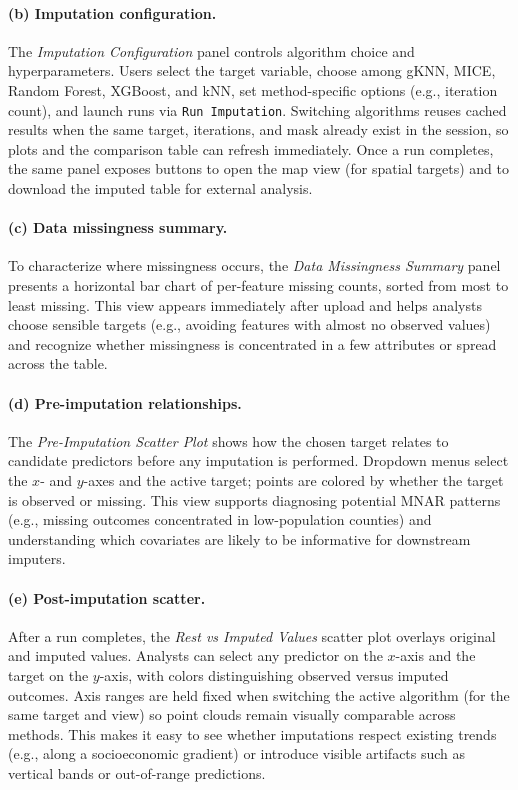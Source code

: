 \documentclass[review]{vgtc}
\begin{document}
\paragraph*{(b) Imputation configuration.}
The \emph{Imputation Configuration} panel controls algorithm choice and hyperparameters. Users select the target variable, choose among gKNN, MICE, Random Forest, XGBoost, and kNN, set method-specific options (e.g., iteration count), and launch runs via \texttt{Run Imputation}. Switching algorithms reuses cached results when the same target, iterations, and mask already exist in the session, so plots and the comparison table can refresh immediately. Once a run completes, the same panel exposes buttons to open the map view (for spatial targets) and to download the imputed table for external analysis.

\paragraph*{(c) Data missingness summary.}
To characterize where missingness occurs, the \emph{Data Missingness Summary} panel presents a horizontal bar chart of per-feature missing counts, sorted from most to least missing. This view appears immediately after upload and helps analysts choose sensible targets (e.g., avoiding features with almost no observed values) and recognize whether missingness is concentrated in a few attributes or spread across the table.

\paragraph*{(d) Pre-imputation relationships.}
The \emph{Pre-Imputation Scatter Plot} shows how the chosen target relates to candidate predictors before any imputation is performed. Dropdown menus select the $x$- and $y$-axes and the active target; points are colored by whether the target is observed or missing. This view supports diagnosing potential MNAR patterns (e.g., missing outcomes concentrated in low-population counties) and understanding which covariates are likely to be informative for downstream imputers.

\paragraph*{(e) Post-imputation scatter.}
After a run completes, the \emph{Rest vs Imputed Values} scatter plot overlays original and imputed values. Analysts can select any predictor on the $x$-axis and the target on the $y$-axis, with colors distinguishing observed versus imputed outcomes. Axis ranges are held fixed when switching the active algorithm (for the same target and view) so point clouds remain visually comparable across methods. This makes it easy to see whether imputations respect existing trends (e.g., along a socioeconomic gradient) or introduce visible artifacts such as vertical bands or out-of-range predictions.
\end{document}
